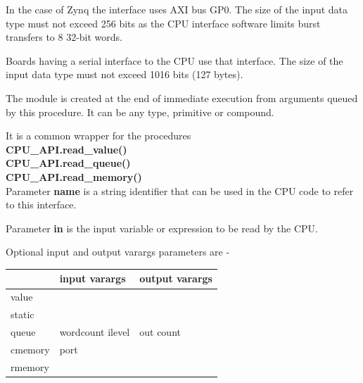             In the case of Zynq the interface uses AXI bus GP0.            
            The size of the input data type must not exceed 256 bits as the CPU
            interface software limits burst transfers to 8 32-bit words.
            
            Boards having a serial interface to the CPU use that interface.
            The size of the input data type must not exceed 1016 bits (127 bytes).
            
            The module is created at the end of immediate execution from
            arguments queued by this procedure. It can be any type, primitive or
            compound.
                        
            It is a common wrapper for the procedures \\
            {\bf CPU\_API.read\_value()}  \\
            {\bf CPU\_API.read\_queue()}  \\
            {\bf CPU\_API.read\_memory()}  \\
            
            Parameter {\bf name} is a string identifier that can be used
            in the CPU code to refer to this interface.
            
            Parameter {\bf in} is the input variable or expression to be read
            by the CPU.
           
            Optional input and output varargs parameters are -
            
            \begin{tabular}{| l | l | l |}
            \hline
                    & input varargs         & output varargs    \\
            \hline \hline
            value   &                       &                   \\
            static  &                       &                   \\
            \hline
            queue   &   wordcount ilevel    & out count         \\
            \hline
            cmemory & port                  &                   \\
            rmemory &                       &                   \\
            \hline
            \end{tabular}




